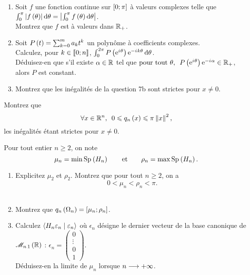 \begin{q}
\begin{enumerate}
    \item Soit \(f\) une fonction continue sur \(\left[0;\pi\right]\) à valeurs complexes telle que \(\int_0^\pi\abs{f\paren{\theta}}\odif{\theta}=\abs{\int_0^\pi f\paren{\theta}\odif{\theta}}\). \\ Montrez que \(f\) est à valeurs dans \(\mathbb{R}_+\). \\
    \item Soit \(P\left(t\right)=\sum_{k=0}^ma_kt^k\) un polynôme à coefficients complexes. \\ Calculez, pour \(k\in\left\llbracket0;n\right\rrbracket\), \(\int_0^{2\pi}P\paren{\e{\i\theta}}\e{-\i k\theta}\odif{\theta}\). \\ Déduisez-en que s'il existe \(\alpha\in\mathbb{R}\) tel que \(\quantifs{\tpt\theta}P\paren{\e{\i\theta}}\e{-\i\alpha}\in\Rp\), alors \(P\) est constant. \\
    \item Montrez que les inégalités de la question 7b sont strictes pour \(x\not=0\).
\end{enumerate}
\end{q}

\begin{q}
Montrez que \[\quantifs{\forall x\in\R^n}0\leq q_n\paren{x}\leq\pi\norme{x}^2,\] les inégalités étant strictes pour \(x\not=0\).
\end{q}

\begin{q}
Pour tout entier \(n\geq2\), on note \[\mu_n=\min\Sp{H_n}\qquad\text{et}\qquad\rho_n=\max\Sp{H_n}.\]

\begin{enumerate}
    \item Explicitez \(\mu_2\) et \(\rho_2\). Montrez que pour tout \(n\geq2\), on a \[0<\mu_n<\rho_n<\pi.\] \\
    \item Montrez que \(q_n\left(\Omega_n\right)=\left[\mu_n;\rho_n\right]\). \\
    \item Calculez \(\left\langle H_n\varepsilon_n\;\middle|\;\varepsilon_n\right\rangle\) où \(\epsilon_n\) désigne le dernier vecteur de la base canonique de \(\M{n\,1}[\R]\) : \(\epsilon_n=\begin{pmatrix}
        0 \\
        \vdots \\
        0 \\
        1
    \end{pmatrix}\). \\ Déduisez-en la limite de \(\mu_n\) lorsque \(n\longrightarrow+\infty\).
\end{enumerate}
\end{q}

